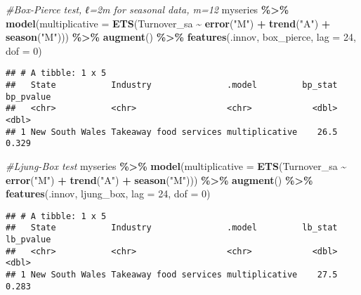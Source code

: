\documentclass[
]{article}
\newenvironment{Shaded}{\begin{snugshade}}{\end{snugshade}}
\newcommand{\AttributeTok}[1]{\textcolor[rgb]{0.13,0.29,0.53}{#1}}
\newcommand{\CommentTok}[1]{\textcolor[rgb]{0.56,0.35,0.01}{\textit{#1}}}
\newcommand{\DecValTok}[1]{\textcolor[rgb]{0.00,0.00,0.81}{#1}}
\newcommand{\FunctionTok}[1]{\textcolor[rgb]{0.13,0.29,0.53}{\textbf{#1}}}
\newcommand{\NormalTok}[1]{#1}
\newcommand{\SpecialCharTok}[1]{\textcolor[rgb]{0.81,0.36,0.00}{\textbf{#1}}}
\newcommand{\StringTok}[1]{\textcolor[rgb]{0.31,0.60,0.02}{#1}}
\begin{document}
\begin{Shaded}
\begin{Highlighting}[]
\CommentTok{\#Box{-}Pierce test, ℓ=2m for seasonal data, m=12}
\NormalTok{myseries }\SpecialCharTok{\%\textgreater{}\%}
  \FunctionTok{model}\NormalTok{(}\AttributeTok{multiplicative =} \FunctionTok{ETS}\NormalTok{(Turnover\_sa }\SpecialCharTok{\textasciitilde{}} \FunctionTok{error}\NormalTok{(}\StringTok{"M"}\NormalTok{) }\SpecialCharTok{+} \FunctionTok{trend}\NormalTok{(}\StringTok{"A"}\NormalTok{) }\SpecialCharTok{+} \FunctionTok{season}\NormalTok{(}\StringTok{"M"}\NormalTok{))) }\SpecialCharTok{\%\textgreater{}\%}
  \FunctionTok{augment}\NormalTok{() }\SpecialCharTok{\%\textgreater{}\%} 
  \FunctionTok{features}\NormalTok{(.innov, box\_pierce, }\AttributeTok{lag =} \DecValTok{24}\NormalTok{, }\AttributeTok{dof =} \DecValTok{0}\NormalTok{)}
\end{Highlighting}
\end{Shaded}

\begin{verbatim}
## # A tibble: 1 x 5
##   State           Industry               .model         bp_stat bp_pvalue
##   <chr>           <chr>                  <chr>            <dbl>     <dbl>
## 1 New South Wales Takeaway food services multiplicative    26.5     0.329
\end{verbatim}

\begin{Shaded}
\begin{Highlighting}[]
\CommentTok{\#Ljung{-}Box test}
\NormalTok{myseries }\SpecialCharTok{\%\textgreater{}\%}
  \FunctionTok{model}\NormalTok{(}\AttributeTok{multiplicative =} \FunctionTok{ETS}\NormalTok{(Turnover\_sa }\SpecialCharTok{\textasciitilde{}} \FunctionTok{error}\NormalTok{(}\StringTok{"M"}\NormalTok{) }\SpecialCharTok{+} \FunctionTok{trend}\NormalTok{(}\StringTok{"A"}\NormalTok{) }\SpecialCharTok{+} \FunctionTok{season}\NormalTok{(}\StringTok{"M"}\NormalTok{))) }\SpecialCharTok{\%\textgreater{}\%}
  \FunctionTok{augment}\NormalTok{() }\SpecialCharTok{\%\textgreater{}\%} 
  \FunctionTok{features}\NormalTok{(.innov, ljung\_box, }\AttributeTok{lag =} \DecValTok{24}\NormalTok{, }\AttributeTok{dof =} \DecValTok{0}\NormalTok{)}
\end{Highlighting}
\end{Shaded}

\begin{verbatim}
## # A tibble: 1 x 5
##   State           Industry               .model         lb_stat lb_pvalue
##   <chr>           <chr>                  <chr>            <dbl>     <dbl>
## 1 New South Wales Takeaway food services multiplicative    27.5     0.283
\end{verbatim}
\end{document}
